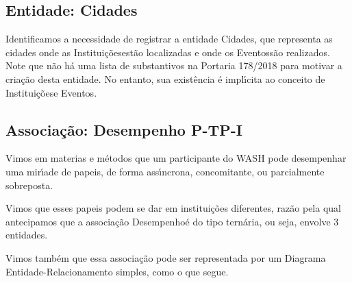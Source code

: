 \documentclass[
12pt,		%
openright,	%
twoside,  %
a4paper,			%
chapter=TITLE,		%
english,			%
french,				%
spanish,			%
brazil				%
]{USPSC-classe/USPSC}
\begin{document}
\subsection[Entidade: Cidades]{Entidade: Cidades}\label{Entidade: Cidades}
Identificamos a necessidade de registrar a entidade \textquotedbl Cidades\textquotedbl , que representa as cidades onde as \textquotedbl Institui\c{c}\~oes\textquotedbl  est\~ao localizadas e onde os \textquotedbl Eventos\textquotedbl  s\~ao realizados. Note que n\~ao h\'a uma lista de substantivos na Portaria 178/2018 para motivar a cria\c{c}\~ao desta entidade. No entanto, sua exist\^encia \'e impl\'{\i}cita ao conceito de \textquotedbl Institui\c{c}\~oes\textquotedbl  e \textquotedbl Eventos\textquotedbl .














\subsection[Associa\c{c}\~ao: Desempenho P-TP-I]{Associa\c{c}\~ao: Desempenho P-TP-I}\label{Associa\c{c}\~ao: Desempenho P-TP-I}
Vimos em materias e m\'etodos que um participante do WASH pode desempenhar uma mir\'{\i}ade de papeis, de forma ass\'{\i}ncrona, concomitante, ou parcialmente sobreposta.














Vimos que esses papeis podem se dar em institui\c{c}\~oes diferentes, raz\~ao pela qual antecipamos que a associa\c{c}\~ao \textquotedbl Desempenho\textquotedbl  \'e do tipo tern\'aria, ou seja, envolve 3 entidades.














Vimos tamb\'em que essa associa\c{c}\~ao pode ser representada por um Diagrama Entidade-Relacionamento simples, como o que segue.
\end{document}
